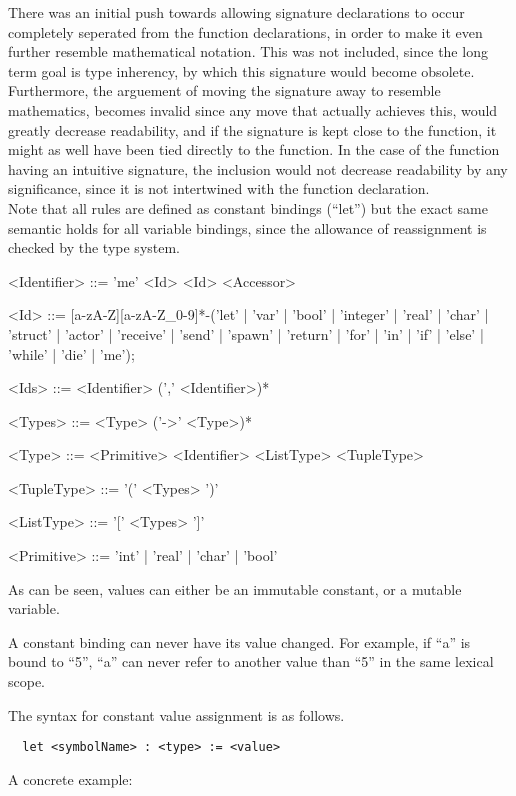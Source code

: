 There was an initial push towards allowing signature declarations to occur completely seperated from the function declarations, in order to make it even further resemble mathematical notation. This was not included, since the long term goal is type inherency, by which this signature would become obsolete. Furthermore, the arguement of moving the signature away to resemble mathematics, becomes invalid since any move that actually achieves this, would greatly decrease readability, and if the signature is kept close to the function, it might as well have been tied directly to the function. In the case of the function having an intuitive signature, the inclusion would not decrease readability by any significance, since it is not intertwined with the function declaration.\\

Note that all rules are defined as constant bindings (\enquote{let}) but the exact same semantic holds for all variable bindings, since the allowance of reassignment is checked by the type system.

\begin{grammar}
<Identifier> ::= 'me'
 \alt <Id>
 \alt <Id> <Accessor>

<Id> ::= [a-zA-Z][a-zA-Z\_0-9]*-('let' | 'var' | 'bool' | 'integer' | 'real' | 'char' | 'struct' | 'actor' | 'receive' | 'send' | 'spawn' | 'return' | 'for' | 'in' | 'if' | 'else' | 'while' | 'die' | 'me');

<Ids> ::= <Identifier> (',' <Identifier>)*

<Types> ::= <Type> ('->' <Type>)*

<Type> ::= <Primitive>
 \alt <Identifier>
 \alt <ListType>
 \alt <TupleType>

<TupleType> ::= '(' <Types> ')'

<ListType> ::= '[' <Types> ']'

<Primitive> ::= 'int' | 'real' | 'char' | 'bool'
\end{grammar}

As can be seen, values can either be an immutable constant, or a mutable variable.

A constant binding can never have its value changed. For example, if \enquote{a} is bound to \enquote{5}, \enquote{a} can never refer to another value than \enquote{5} in the same lexical scope. 

The syntax for constant value assignment is as follows.
\begin{verbatim}
  let <symbolName> : <type> := <value>
\end{verbatim}
A concrete example:

